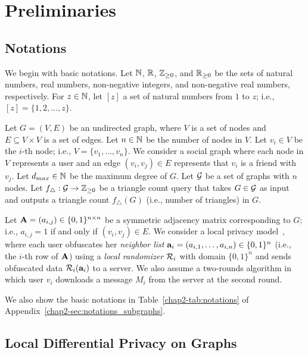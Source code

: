 \section{Preliminaries}
\label{chap2-sec:preliminaries}

\subsection{Notations}
\label{chap2-sub:notations}
We begin with basic notations. 
Let $\mathbb{N}$, $\mathbb{R}$, $\mathbb{Z}_{\ge0}$, and $\mathbb{R}_{\ge0}$ be the sets of natural numbers, real numbers, non-negative integers, and non-negative real numbers, respectively. 
For $z\in\mathbb{N}$, let $[z]$ a set of natural numbers from $1$ to $z$; i.e., $[z] = \{1, 2, \ldots, z\}$. 

Let $G=(V,E)$ be an undirected graph, where $V$ is a set of nodes and $E \subseteq V \times V$ is a set of edges. 
Let $n\in\mathbb{N}$ be the number of nodes in $V$. 
Let $v_i \in V$ be the $i$-th node; i.e., $V=\{v_1,\ldots,v_n\}$. 
We consider a social graph where each node in $V$ represents a user and an edge $(v_i,v_j) \in E$ represents that $v_i$ is a friend with $v_j$. 
Let $d_{max} \in \mathbb{N}$ be the maximum degree of $G$. 
Let $\mathcal{G}$ be a set of graphs with $n$ nodes. 
Let $f_\triangle: \mathcal{G} \rightarrow \mathbb{Z}_{\ge0}$ be a triangle 
count query 
that takes $G \in \mathcal{G}$ as input and outputs 
a triangle count $f_\triangle(G)$ (i.e., number of triangles) in $G$. 



Let $\mathbf{A}=(a_{i,j}) \in \{0,1\}^{n \times n}$ be a symmetric adjacency matrix corresponding to $G$; i.e., $a_{i,j} = 1$ if and only if $(v_i,v_j) \in E$. 
We consider a local privacy model~\cite{qin2017generating,Imola_USENIX21}, where each user obfuscates her \textit{neighbor list} $\mathbf{a}_i = (a_{i,1}, \ldots, a_{i,n})\in\{0,1\}^n$ (i.e., the $i$-th row of $\mathbf{A}$) using 
a \textit{local randomizer} 
$\mathcal{R}_i$ with domain $\{0,1\}^n$ and sends obfuscated data $\mathcal{R}_i(\mathbf{a}_i)$ to a server. 
We also assume a two-rounds algorithm in which user $v_i$ downloads a message $M_i$ from the server at the second round. 

We also show the basic notations in Table~\ref{chap2-tab:notations} of Appendix~\ref{chap2-sec:notations_subgraphs}.

\subsection{Local Differential Privacy on Graphs}
\label{chap2-sub:LDP}


